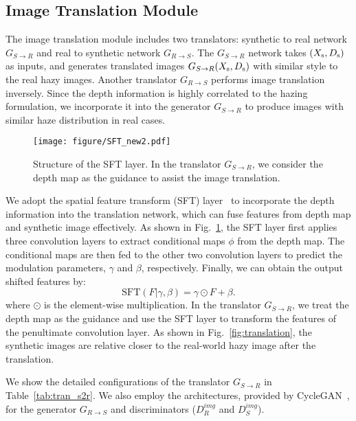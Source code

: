 \documentclass[10pt,twocolumn,letterpaper]{article}
\begin{document}
\subsection{Image Translation Module}
The image translation module includes two translators: synthetic to real network ${G_{S \to R}}$ and real to synthetic network ${G_{R \to S}}$.
The ${G_{S \to R}}$ network takes $({X_{\rm{s}}},{D_{\rm{s}}})$ as inputs, and generates translated images ${G_{S \to R}}({X_{\rm{s}}},{D_{\rm{s}}})$ with similar style to the real hazy images.
Another translator ${G_{R \to S}}$ performs image translation inversely.
Since the depth information is highly correlated to the hazing formulation, we incorporate it into the generator ${G_{S \to R}}$ to produce images with similar haze distribution in real cases.
\begin{figure}[t]
\centering
    \texttt{[image: figure/SFT\_new2.pdf]}
\caption{Structure of the SFT layer.
In the translator ${G_{S \to R}}$, we consider the depth map as the guidance to assist the image translation.
}
\label{fig:SFT_layer}
\end{figure}


We adopt the spatial feature transform (SFT) layer~\cite{wang2018recovering, li2020dyna} to incorporate the depth information into the translation network, which can fuse features from depth map and synthetic image effectively. 
As shown in Fig.~\ref{fig:SFT_layer}, the SFT layer first applies three convolution layers to extract conditional maps $\phi$ from the depth map.
The conditional maps are then fed to the other two convolution layers to predict the modulation parameters, $\gamma$ and $\beta$, respectively.
Finally, we can obtain the output shifted features by:
\begin{equation}
	\label{eqn:SFT_layer}
	\mathrm{SFT}(F|\gamma ,\beta) = \gamma \odot F + \beta.
\end{equation}
where $\odot$ is the element-wise multiplication.
In the translator ${G_{S \to R}}$, we treat the depth map as the guidance and use the SFT layer to transform the features of the penultimate convolution layer.
As shown in Fig.~\ref{fig:translation}, the synthetic images are relative closer to the real-world hazy image after the translation.


We show the detailed configurations of the translator ${G_{S \to R}}$ in Table~\ref{tab:tran_s2r}.
We also employ the architectures, provided by CycleGAN~\cite{zhu2017unpaired}, for the generator ${G_{R \to S}}$ and discriminators ($D_R^{img}$ and $D_S^{img}$).
\end{document}
